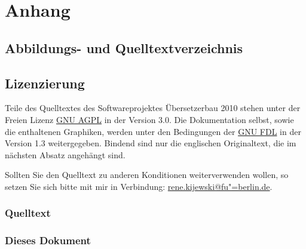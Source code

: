 \documentclass[10pt,a4paper,ngerman,titlepage,tocindentauto]{scrartcl}
\begin{document}
	\newpage
	\section{Anhang}
		\subsection{Abbildungs- und Quelltextverzeichnis}
			\listoffigures
			\lstlistoflistings
		
		\subsection{Lizenzierung}
			Teile des Quelltextes des Softwareprojektes Übersetzerbau 2010 stehen unter der Freien
			Lizenz \href{http://www.gnu.org/licenses/agpl-3.0.html}{GNU AGPL} in der Version 3.0.
			Die Dokumentation selbst, sowie die enthaltenen Graphiken, werden unter den Bedingungen
			der \href{http://www.gnu.org/licenses/fdl-1.3.html}{GNU FDL} in der Version 1.3 weitergegeben.
			Bindend sind nur die englischen Originaltext, die im nächsten Absatz angehängt sind.
			
			Sollten Sie den Quelltext zu anderen Konditionen weiterverwenden wollen, so setzen Sie
			sich bitte mit mir in Verbindung:
			\href{mailto:rene.kijewski@fu-berlin.de?subject=[SWP_CP_2010]}{rene.kijewski@fu"=berlin.de}.
			
			\subsubsection{Quelltext}
				\begin{multicols}{3}
					{\tiny}
				\end{multicols}
			
			\subsubsection[Dieses Dokument]{Dieses Dokument}
				\begin{multicols}{3}
					{\tiny}
				\end{multicols}
\end{document}

